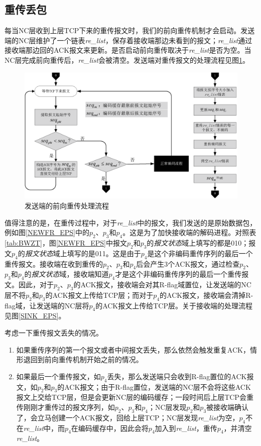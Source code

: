 \subsection{重传丢包}
每当NC层收到上层TCP下来的重传报文时，我们的前向重传机制才会启动。发送端的NC层维护了一个链表\emph{re\_list}，保存着接收端那边未看到的报文；\emph{re\_list}通过接收端那边回的ACK报文来更新。是否启动前向重传取决于\emph{re\_list}是否为空。当NC层完成前向重传后，\emph{re\_list}会被清空。发送端对重传报文的处理流程见图\ref{FRT_EPS}。
\begin{figure}[htbp]
	\centering
	\includegraphics[width=6in]{figures/frt.eps}
	\caption{发送端的前向重传处理流程}
	\label{FRT_EPS}
\end{figure}
\par
值得注意的是，在重传过程中，对于\emph{re\_list}中的报文，我们发送的是原始数据包，例如图\ref{NEWFR_EPS}中的$p_2$、$p_3$和$p_4$。这是为了加快接收端的解码进程。对照表\ref{tab:BWZT}，图\ref{NEWFR_EPS}中报文$p_2$和$p_3$的\emph{报文状态}域上填写的都是010；报文$p_4$的\emph{报文状态}域上填写的是011。这是由于$p_4$是这个非编码重传序列的最后一个重传报文。接收端在收到重传的$p_2$、$p_3$和$p_4$后会产生3个ACK报文，通过检查$p_2$、$p_3$和$p_4$的\emph{报文状态}域，接收端知道$p_4$才是这个非编码重传序列的最后一个重传报文。因此，对于$p_2$、$p_3$的ACK报文，接收端会对其R-flag域置位，让发送端的NC层不将$p_2$和$p_3$的ACK报文上传给TCP层；而对于$p_4$的ACK报文，接收端会清掉R-flag域，让发送端的NC层将$p_4$的ACK报文上传给TCP层。关于接收端的处理流程见图\ref{SINK_EPS}。
\par
考虑一下重传报文丢失的情况。
\begin{enumerate}[fullwidth,itemindent=2em,label=(\arabic*)]
	\item 如果重传序列的第一个报文或者中间报文丢失，那么依然会触发重复ACK，情形退回到前向重传机制开始之前的情况。
	\item 如果最后一个重传报文，如$p_4$丢失，那么发送端只会收到R-flag置位的ACK报文，如$p_2$和$p_3$的ACK报文；由于R-flag置位，发送端的NC层不会将这些ACK报文上交给TCP层，但是会更新NC层的编码缓存；一段时间后上层TCP会重传刚刚才重传过的报文序列，如$p_2$、$p_3$和$p_4$；NC层发现$p_2$和$p_3$被接收端确认了，会立马创建一个ACK报文，回给上层TCP；NC层发现\emph{re\_list}为空，$p_4$不在\emph{re\_list}中，而$p_4$在编码缓存中，因此会将$p_4$加入到\emph{re\_list}，重传$p_4$，并清空\emph{re\_list}。
\end{enumerate}

